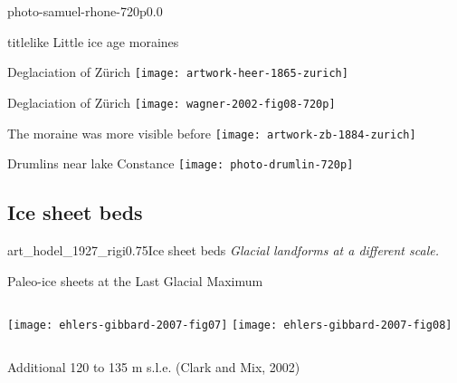     \begin{backgroundframe}[b]{photo-samuel-rhone-720p}{0.0}{}
      \begin{beamercolorbox}[sep=1em,wd=45mm]{titlelike}
        Little ice age moraines
      \end{beamercolorbox}
    \end{backgroundframe}

    \begin{frame}{Deglaciation of Zürich}
      \texttt{[image: artwork-heer-1865-zurich]}
    \end{frame}

    \begin{frame}{Deglaciation of Zürich}
      \texttt{[image: wagner-2002-fig08-720p]}
    \end{frame}

    \begin{frame}{The moraine was more visible before}
      \texttt{[image: artwork-zb-1884-zurich]}
    \end{frame}

    \begin{frame}{Drumlins near lake Constance}
      \texttt{[image: photo-drumlin-720p]}
    \end{frame}


\subsection{Ice sheet beds}

    \begin{sectionframe}{art_hodel_1927_rigi}{0.75}{Ice sheet beds}
      \emph{Glacial landforms at a different scale.}
    \end{sectionframe}

    \begin{frame}{Paleo-ice sheets at the Last Glacial Maximum}
      \begin{columns}
        \column{60mm}
          \texttt{[image: ehlers-gibbard-2007-fig07]}
        \column{60mm}
          \texttt{[image: ehlers-gibbard-2007-fig08]}
      \end{columns}
      \bigskip
      Additional 120 to 135 m s.l.e. (Clark and Mix, 2002)
    \end{frame}

